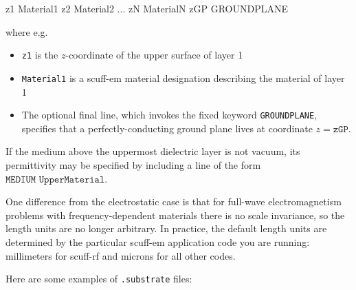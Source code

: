 \documentclass[letterpaper]{article}
\begin{document}
\medskip

\begin{verbcode}
z1  Material1
z2  Material2
...
zN  MaterialN
zGP GROUNDPLANE
\end{verbcode}

\medskip

where e.g.
\begin{itemize}
 \item \texttt{z1} is the $z$-coordinate of the upper surface of
       layer 1
 \item \texttt{Material1} is a {\sc scuff-em} material designation
       describing the material of layer 1
 \item The optional 
       final line, which invokes the fixed keyword \texttt{GROUNDPLANE},
       specifies that a perfectly-conducting ground plane lives at 
       coordinate $z=\texttt{zGP}$.
\end{itemize}
If the medium above the uppermost dielectric layer is not vacuum,
its permittivity may be specified by including a line of the form
$\texttt{MEDIUM UpperMaterial}.$

One difference from the electrostatic case is that for full-wave
electromagnetism problems with frequency-dependent materials
there is no scale invariance, so the length units are no longer
arbitrary. In practice, the default length units are determined
by the particular {\sc scuff-em} application code you are running:
millimeters for {\sc scuff-rf} and microns for all other codes.

Here are some examples of \texttt{.substrate} files:
\end{document}

